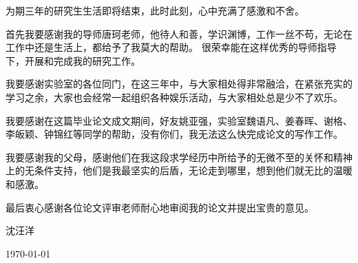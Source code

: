 ﻿
\begin{thanks}
为期三年的研究生生活即将结束，此时此刻，心中充满了感激和不舍。

首先我要感谢我的导师唐珂老师，他待人和善，学识渊博，工作一丝不苟，无论在工作中还是生活上，都给予了我莫大的帮助。
很荣幸能在这样优秀的导师指导下，开展和完成我的研究工作。

我要感谢实验室的各位同门，在这三年中，与大家相处得非常融洽，在紧张充实的学习之余，大家也会经常一起组织各种娱乐活动，与大家相处总是少不了欢乐。

我要感谢在这篇毕业论文成文期间，好友姚亚强，实验室魏语凡、姜春晖、谢格、李皈颖、钟锦红等同学的帮助，没有你们，我无法这么快完成论文的写作工作。

我要感谢我的父母，感谢他们在我这段求学经历中所给予的无微不至的关怀和精神上的无条件支持，他们是我最坚实的后盾，无论走到哪里，想到他们就无比的温暖和感激。

最后衷心感谢各位论文评审老师耐心地审阅我的论文并提出宝贵的意见。
\begin{flushright}
沈汪洋

\today
\end{flushright}

\end{thanks}
